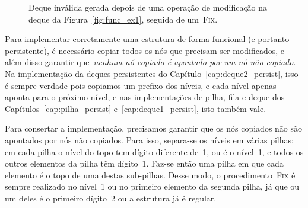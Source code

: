 \documentclass[main.tex]{subfiles}
\begin{document}
\begin{figure}[h]
\centering
{}
\caption{Deque inválida gerada depois de uma operação de modificação na deque da Figura~\ref{fig:func_ex1}, seguida de um~\textsc{Fix}.} \label{fig:func_ex1res}
\end{figure}


Para implementar corretamente uma estrutura de forma funcional (e portanto persistente), é necessário copiar todos os nós que precisam ser modificados, e além disso garantir que~\emph{nenhum nó copiado é apontado por um nó não copiado}. Na implementação da deques persistentes do Capítulo~\ref{cap:deque2_persist}, isso é sempre verdade pois copiamos um prefixo dos níveis, e cada nível apenas aponta para o próximo nível, e nas implementações de pilha, fila e deque dos Capítulos~\ref{cap:pilha_persist} e~\ref{cap:deque1_persist}, isto também vale.

Para consertar a implementação, precisamos garantir que os nós copiados não são apontados por nós não copiados. Para isso, separa-se os níveis em várias pilhas; em cada pilha o nível do topo tem dígito diferente de~1, ou é o nível~1, e todos os outros elementos da pilha têm dígito~1. Faz-se então uma pilha em que cada elemento é o topo de uma destas sub-pilhas. Desse modo, o procedimento~\textsc{Fix} é sempre realizado no nível~1 ou no primeiro elemento da segunda pilha, já que ou um deles é o primeiro dígito~2 ou a estrutura já é regular.
\end{document}
